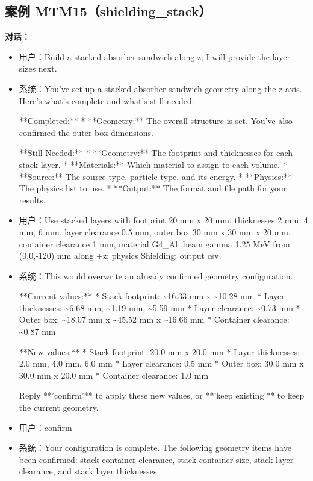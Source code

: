 \documentclass[11pt]{ctexart}
\begin{document}
\subsection{案例 MTM15（shielding\_stack）}
\textbf{对话：}
\begin{itemize}
\item 用户：Build a stacked absorber sandwich along z; I will provide the layer sizes next.
\item 系统：You've set up a stacked absorber sandwich geometry along the z-axis. Here's what's complete and what's still needed:

**Completed:**
*   **Geometry:** The overall structure is set. You've also confirmed the outer box dimensions.

**Still Needed:**
*   **Geometry:** The footprint and thicknesses for each stack layer.
*   **Materials:** Which material to assign to each volume.
*   **Source:** The source type, particle type, and its energy.
*   **Physics:** The physics list to use.
*   **Output:** The format and file path for your results.
\item 用户：Use stacked layers with footprint 20 mm x 20 mm, thicknesses 2 mm, 4 mm, 6 mm, layer clearance 0.5 mm, outer box 30 mm x 30 mm x 20 mm, container clearance 1 mm, material G4\_Al; beam gamma 1.25 MeV from (0,0,-120) mm along +z; physics Shielding; output csv.
\item 系统：This would overwrite an already confirmed geometry configuration.

**Current values:**
*   Stack footprint: \textasciitilde{}16.33 mm x \textasciitilde{}10.28 mm
*   Layer thicknesses: \textasciitilde{}6.68 mm, \textasciitilde{}1.19 mm, \textasciitilde{}5.59 mm
*   Layer clearance: \textasciitilde{}0.73 mm
*   Outer box: \textasciitilde{}18.07 mm x \textasciitilde{}45.52 mm x \textasciitilde{}16.66 mm
*   Container clearance: \textasciitilde{}0.87 mm

**New values:**
*   Stack footprint: 20.0 mm x 20.0 mm
*   Layer thicknesses: 2.0 mm, 4.0 mm, 6.0 mm
*   Layer clearance: 0.5 mm
*   Outer box: 30.0 mm x 30.0 mm x 20.0 mm
*   Container clearance: 1.0 mm

Reply **'confirm'** to apply these new values, or **'keep existing'** to keep the current geometry.
\item 用户：confirm
\item 系统：Your configuration is complete. The following geometry items have been confirmed: stack container clearance, stack container size, stack layer clearance, and stack layer thicknesses.
\end{itemize}
\end{document}
